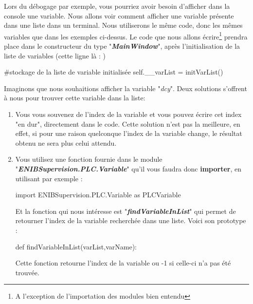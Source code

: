 \documentclass[12pt]{report}    %
\newcommand{\bold}[1]{{\bfseries #1}}
\newcommand{\italic}[1]{{\itshape #1}}
\newcommand{\ib}[1]{{\bfseries\itshape #1}}
\newcommand{\smallSkip}{\vskip 0.5cm}
\begin{document}
Lors du débogage par exemple, vous pourriez avoir besoin d'afficher dans la console une variable. Nous allons voir comment afficher une variable présente dans une liste dans un terminal.\newline
Nous utiliserons le même code, donc les mêmes variables que dans les exemples ci-dessus.\newline
Le code que nous allons écrire\footnote{A l'exception de l'importation des modules bien entendu} prendra place dans le constructeur du type "\ib{MainWindow}", après l'initialisation de la liste de variables (cette ligne là : )
\begin{pyCode}
#stockage de la liste de variable initialisée
self.__varList = initVarList()
\end{pyCode}
\smallSkip

Imaginons que nous souhaitions afficher la variable "\italic{dcy}". Deux solutions s'offrent à nous pour trouver cette variable dans la liste:
\begin{enumerate}
\item Vous vous souvenez de l'index de la variable et vous pouvez écrire cet index "en dur", directement dans le code. Cette solution n'est pas la meilleure, en effet, si pour une raison quelconque l'index de la variable change, le résultat obtenu ne sera plus celui attendu.

\item Vous utilisez une fonction fournie dans le module "\ib{ENIBSupervision.PLC.Variable}" qu'il vous faudra donc \bold{importer}, en utilisant par exemple :
\begin{pyCode}
import ENIBSupervision.PLC.Variable as PLCVariable
\end{pyCode}
Et la fonction qui nous intéresse est "\ib{findVariableInList}" qui permet de retourner l'index de la variable recherchée dans une liste. Voici son prototype :
\begin{pyCode}
def findVariableInList(varList,varName):
\end{pyCode}
Cette fonction retourne l'index de la variable ou -1 si celle-ci n'a pas été trouvée.
\end{enumerate}
\smallSkip
\end{document}
